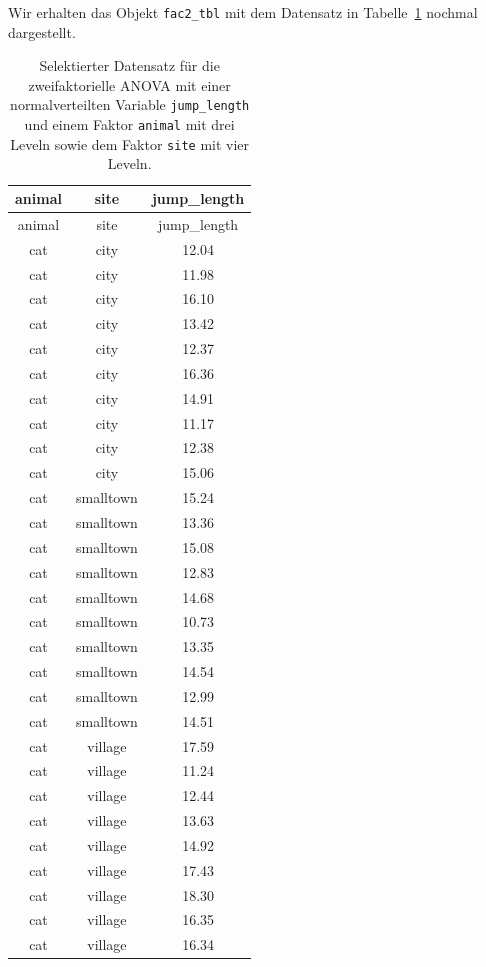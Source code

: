 \documentclass[
  letterpaper,
]{scrbook}
\begin{document}
Wir erhalten das Objekt \texttt{fac2\_tbl} mit dem Datensatz in
Tabelle~\ref{tbl-data-anova-2} nochmal dargestellt.

\hypertarget{tbl-data-anova-2}{}
\begin{longtable}[]{@{}ccc@{}}
\caption{\label{tbl-data-anova-2}Selektierter Datensatz für die
zweifaktorielle ANOVA mit einer normalverteilten Variable
\texttt{jump\_length} und einem Faktor \texttt{animal} mit drei Leveln
sowie dem Faktor \texttt{site} mit vier Leveln.}\tabularnewline
\toprule()
animal & site & jump\_length \\
\midrule()
\endfirsthead
\toprule()
animal & site & jump\_length \\
\midrule()
\endhead
cat & city & 12.04 \\
cat & city & 11.98 \\
cat & city & 16.10 \\
cat & city & 13.42 \\
cat & city & 12.37 \\
cat & city & 16.36 \\
cat & city & 14.91 \\
cat & city & 11.17 \\
cat & city & 12.38 \\
cat & city & 15.06 \\
cat & smalltown & 15.24 \\
cat & smalltown & 13.36 \\
cat & smalltown & 15.08 \\
cat & smalltown & 12.83 \\
cat & smalltown & 14.68 \\
cat & smalltown & 10.73 \\
cat & smalltown & 13.35 \\
cat & smalltown & 14.54 \\
cat & smalltown & 12.99 \\
cat & smalltown & 14.51 \\
cat & village & 17.59 \\
cat & village & 11.24 \\
cat & village & 12.44 \\
cat & village & 13.63 \\
cat & village & 14.92 \\
cat & village & 17.43 \\
cat & village & 18.30 \\
cat & village & 16.35 \\
cat & village & 16.34 \\

\end{longtable}
\end{document}

